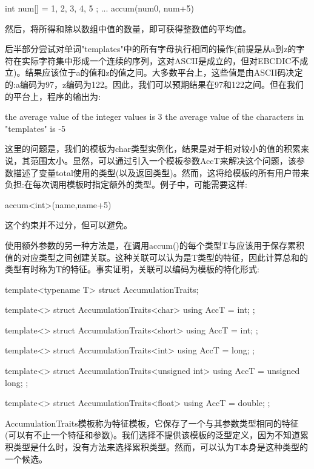 \begin{cpp}
int num[] = { 1, 2, 3, 4, 5 };
...
accum(num0, num+5)
\end{cpp}

然后，将所得和除以数组中值的数量，即可获得整数值的平均值。

后半部分尝试对单词"templates"中的所有字母执行相同的操作(前提是从a到z的字符在实际字符集中形成一个连续的序列，这对ASCII是成立的，但对EBCDIC不成立)。结果应该位于a的值和z的值之间。大多数平台上，这些值是由ASCII码决定的:a编码为97，z编码为122。因此，我们可以预期结果在97和122之间。但在我们的平台上，程序的输出为:

\begin{shell}
the average value of the integer values is 3
the average value of the characters in "templates" is -5
\end{shell}

这里的问题是，我们的模板为char类型实例化，结果是对于相对较小的值的积累来说，其范围太小。显然，可以通过引入一个模板参数AccT来解决这个问题，该参数描述了变量total使用的类型(以及返回类型)。然而，这将给模板的所有用户带来负担:在每次调用模板时指定额外的类型。例子中，可能需要这样:

\begin{cpp}
accum<int>(name,name+5)
\end{cpp}

这个约束并不过分，但可以避免。

使用额外参数的另一种方法是，在调用accum()的每个类型T与应该用于保存累积值的对应类型之间创建关联。这种关联可以认为是T类型的特征，因此计算总和的类型有时称为T的特征。事实证明，关联可以编码为模板的特化形式:

\begin{cpp}
template<typename T>
struct AccumulationTraits;

template<>
struct AccumulationTraits<char> {
	using AccT = int;
};

template<>
struct AccumulationTraits<short> {
	using AccT = int;
};

template<>
struct AccumulationTraits<int> {
	using AccT = long;
};

template<>
struct AccumulationTraits<unsigned int> {
	using AccT = unsigned long;
};

template<>
struct AccumulationTraits<float> {
	using AccT = double;
};
\end{cpp}

AccumulationTraits模板称为特征模板，它保存了一个与其参数类型相同的特征(可以有不止一个特征和参数)。我们选择不提供该模板的泛型定义，因为不知道累积类型是什么时，没有方法来选择累积类型。然而，可以认为T本身是这种类型的一个候选。

